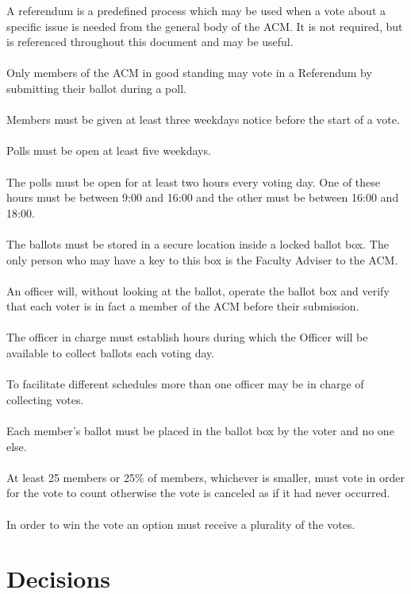 \documentclass[12pt,titlepage]{article}
\begin{document}
A referendum is a predefined process which may be used when a vote about a specific issue is needed from the general body of the ACM. It is not required, but is referenced throughout this document and may be useful.\\ 
\\
Only members of the ACM in good standing may vote in a Referendum by submitting their ballot during a poll.\\
\\
Members must be given at least three weekdays notice before the start of a vote.\\
\\
Polls must be open at least five weekdays.\\
\\
The polls must be open for at least two hours every voting day. One of these hours must be between 9:00 and 16:00 and the other must be between 16:00 and 18:00.\\
\\
The ballots must be stored in a secure location inside a locked ballot box. The only person who may have a key to this box is the Faculty Adviser to the ACM.\\
\\
An officer will, without looking at the ballot, operate the ballot box and verify that each voter is in fact a member of the ACM before their submission.\\
\\
The officer in charge must establish hours during which the Officer will be available to collect ballots each voting day.\\
\\
To facilitate different schedules more than one officer may be in charge of collecting votes.\\
\\
Each member's ballot must be placed in the ballot box by the voter and no one else.\\
\\
At least 25 members or 25\% of members, whichever is smaller, must vote in order for the vote to count otherwise the vote is canceled as if it had never occurred.\\
\\
In order to win the vote an option must receive a plurality of the votes.

\section{Decisions}
\end{document}
